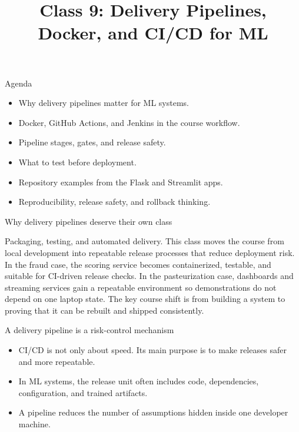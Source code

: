 

\title{Class 9: Delivery Pipelines, Docker, and CI/CD for ML}
\author{\coursename}
\date{}



\frame{\titlepage \coursefooter}

\begin{frame}{Agenda}
\begin{itemize}
\item Why delivery pipelines matter for ML systems.
\item Docker, GitHub Actions, and Jenkins in the course workflow.
\item Pipeline stages, gates, and release safety.
\item What to test before deployment.
\item Repository examples from the Flask and Streamlit apps.
\item Reproducibility, release safety, and rollback thinking.
\end{itemize}
\coursefooter
\end{frame}

\begin{frame}{Why delivery pipelines deserve their own class}
\coursefooter
\end{frame}

\coursecontextframe
{Packaging, testing, and automated delivery.}
{This class moves the course from local development into repeatable release processes that reduce deployment risk.}
{In the fraud case, the scoring service becomes containerized, testable, and suitable for CI-driven release checks.}
{In the pasteurization case, dashboards and streaming services gain a repeatable environment so demonstrations do not depend on one laptop state.}
{The key course shift is from building a system to proving that it can be rebuilt and shipped consistently.}

\begin{frame}{A delivery pipeline is a risk-control mechanism}
\begin{itemize}
\item CI/CD is not only about speed. Its main purpose is to make releases safer and more repeatable.
\item In ML systems, the release unit often includes code, dependencies, configuration, and trained artifacts.
\item A pipeline reduces the number of assumptions hidden inside one developer machine.
\end{itemize}
\coursefooter
\end{frame}

